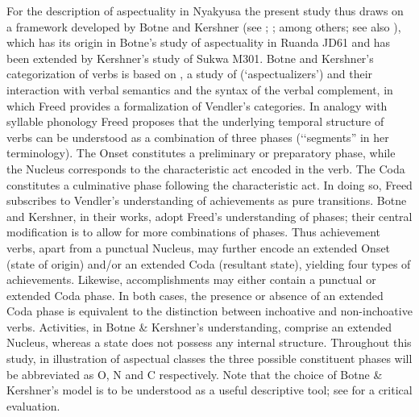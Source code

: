 For the description of aspectuality in Nyakyusa the present study thus draws on a framework developed by Botne and Kershner (see \citealt{BotneR1983}; \citealt{KershnerT2002}; \citealt{BotneRKershnerT2008} among others; see also ), which has its origin in Botne's study of aspectuality in Ruanda JD61 and has been extended by Kershner's study of Sukwa M301. Botne and Kershner's categorization of verbs is based on \citet{FreedA1979}, a study of   (\lq aspectualizers') and their interaction with verbal semantics and the syntax of the verbal complement, in which Freed provides a formalization of Vendler's categories. In analogy with syllable phonology Freed proposes that the underlying temporal structure of verbs can be understood as a combination of three phases (\lq\lq segments'' in her terminology). The Onset constitutes a preliminary or preparatory phase, while the Nucleus corresponds to the characteristic act encoded in the verb. The Coda constitutes a culminative phase following the characteristic act. In doing so, Freed subscribes to Vendler's understanding of achievements as pure transitions. Botne and Kershner, in their works, adopt Freed's understanding of phases; their central modification is to allow for more combinations of phases. Thus achievement verbs, apart from a punctual Nucleus, may further encode an extended Onset (state of origin) and/or an extended Coda (resultant state), yielding four types of achievements. Likewise, accomplishments may either contain a punctual or extended Coda phase. In both cases, the presence or absence of an extended Coda phase is equivalent to the distinction between inchoative and non-inchoative verbs. Activities, in Botne \& Kershner's understanding, comprise an extended Nucleus, whereas a state does not possess any internal structure. Throughout this study, in illustration of aspectual classes the three possible constituent phases will be abbreviated as O, N and C respectively. Note that the choice of Botne \& Kershner's model is to be understood as a useful descriptive tool; see \citet{PersohnB2017b} for a critical evaluation.   

